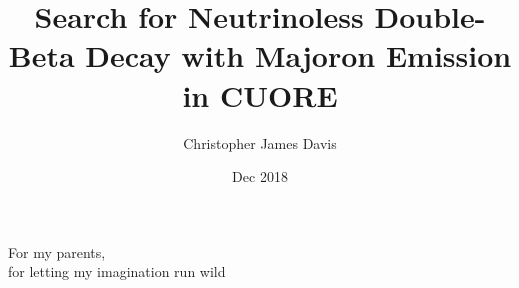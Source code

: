 \documentclass[12 pt]{mythesis}
\author{Christopher James Davis}
\title{Search for Neutrinoless Double-Beta Decay with Majoron Emission in CUORE}
\date{Dec 2018}
\begin{document}
\frontmatter

\maketitle

\makecopyright

\tableofcontents
\listoffigures
\listoftables

%
\mainmatter

\begin{flushright}
\null {}
For my parents, \\
for letting my imagination run wild
\null
\end{flushright}









\backmatter
\appendix



\end{document}
